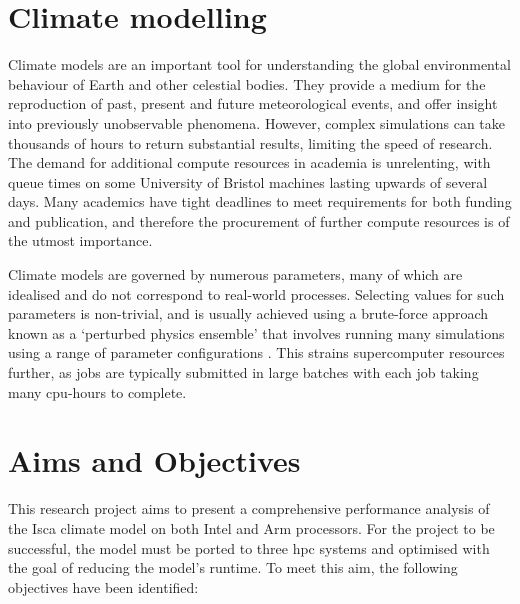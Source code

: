 \documentclass[a4paper,11pt]{report}
\begin{document}
\section{Climate modelling}
Climate models are an important tool for understanding the global environmental behaviour of Earth and other celestial bodies. They provide a medium for the reproduction of past, present and future meteorological events, and offer insight into previously unobservable phenomena. However, complex simulations can take thousands of hours to return substantial results, limiting the speed of research. The demand for additional compute resources in academia is unrelenting, with queue times on some University of Bristol machines lasting upwards of several days. Many academics have tight deadlines to meet requirements for both funding and publication, and therefore the procurement of further compute resources is of the utmost importance.%
\par
Climate models are governed by numerous parameters, many of which are idealised and do not correspond to real-world processes. Selecting values for such parameters is non-trivial, and is usually achieved using a brute-force approach known as a ‘perturbed physics ensemble’ that involves running many simulations using a range of parameter configurations \cite{evans2012evaluating}. This strains supercomputer resources further, as jobs are typically submitted in large batches with each job taking many cpu-hours to complete.


\section{Aims and Objectives}
This research project aims to present a comprehensive performance analysis of the Isca climate model on both Intel and Arm processors. For the project to be successful, the model must be ported to three \gls{hpc} systems and optimised with the goal of reducing the model's runtime. To meet this aim, the following objectives have been identified:
\end{document}
